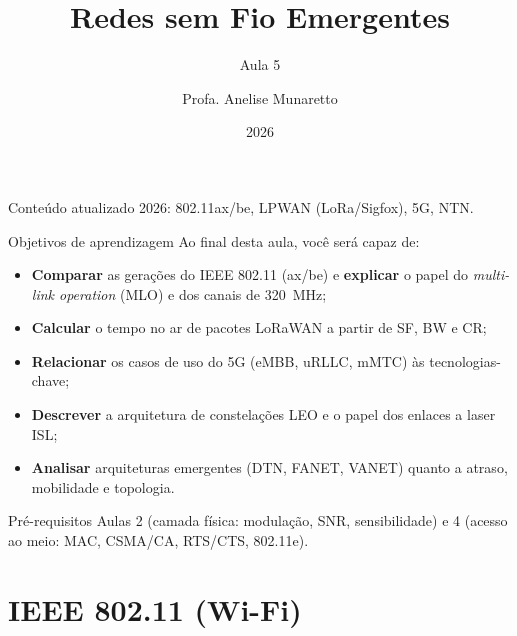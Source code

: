 \documentclass[aspectratio=169,11pt]{beamer}
\title[Redes sem Fio]{Redes sem Fio Emergentes}
\subtitle{Aula 5}
\author[Anelise Munaretto]{Profa. Anelise Munaretto}
\institute[Curso]{Redes sem Fio --- Ciência da Computação}
\date{2026}
\begin{document}
\begin{frame}[plain]
  \titlepage
  \begin{center}
    \scriptsize Conteúdo atualizado 2026: 802.11ax/be, LPWAN (LoRa/Sigfox), 5G, NTN.
  \end{center}
\end{frame}

\begin{frame}{Objetivos de aprendizagem}
  Ao final desta aula, você será capaz de:
  \begin{itemize}
    \item \textbf{Comparar} as gerações do IEEE 802.11 (ax/be) e \textbf{explicar} o papel do \emph{multi-link operation} (MLO) e dos canais de 320~MHz;
    \item \textbf{Calcular} o tempo no ar de pacotes LoRaWAN a partir de SF, BW e CR;
    \item \textbf{Relacionar} os casos de uso do 5G (eMBB, uRLLC, mMTC) às tecnologias-chave;
    \item \textbf{Descrever} a arquitetura de constelações LEO e o papel dos enlaces a laser ISL;
    \item \textbf{Analisar} arquiteturas emergentes (DTN, FANET, VANET) quanto a atraso, mobilidade e topologia.
  \end{itemize}
  \begin{alertblock}{Pré-requisitos}
    Aulas 2 (camada física: modulação, SNR, sensibilidade) e 4 (acesso ao meio: MAC, CSMA/CA, RTS/CTS, 802.11e).
  \end{alertblock}
\end{frame}

\section{IEEE 802.11 (Wi-Fi)}
\end{document}
